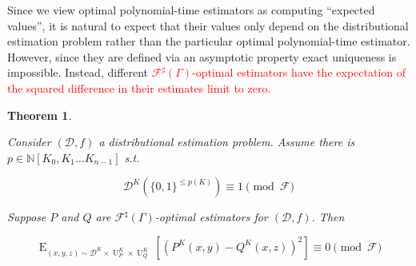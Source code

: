 \documentclass[11pt]{article}
\numberwithin{equation}{section}
\theoremstyle{definition}
\theoremstyle{plain}
\newtheorem{theorem}{Theorem}[section]
\newcommand{\Bool}{\{0,1\}}
\DeclareMathOperator{\E}{E}
\DeclareMathOperator{\Un}{U}
\newcommand{\Nats}{\mathbb{N}}
\newcommand{\NatPoly}{\Nats[K_0, K_1 \ldots K_{n-1}]}
\newcommand{\Dist}{\mathcal{D}}
\newcommand{\Fall}{\mathcal{F}}
\newcommand{\ESG}{\Fall^\sharp(\Gamma)}
\begin{document}
Since we view optimal polynomial-time estimators as computing \enquote{expected values}, it is natural to expect that their values only depend on the distributional estimation problem rather than the particular optimal polynomial-time estimator. However, since they are defined via an asymptotic property exact uniqueness is impossible. Instead, different \textcolor{red}{$\Fall^\sharp(\Gamma)$-optimal estimators have the expectation of the squared difference in their estimates limit to zero.}

\begin{samepage}
\begin{theorem}
\label{thm:uniq}

Consider ${(\Dist,f)}$ a distributional estimation problem. Assume there is\\ ${p \in \NatPoly}$ s.t. 

\begin{equation}
\label{eqn:thm__uniq__dist}
\Dist^K(\Bool^{\leq p(K)}) \equiv 1 \pmod \Fall
\end{equation}

Suppose ${P}$ and ${Q}$ are ${\ESG}$-optimal estimators for ${(\Dist,f)}$. Then

\begin{equation}
\label{eqn:thm__uniq}
\E_{(x,y,z) \sim \Dist^K \times \Un_P^K \times \Un_Q^K}[(P^K(x,y)-Q^K(x,z))^2] \equiv 0 \pmod \Fall
\end{equation}

\end{theorem}
\end{samepage}
\end{document}
